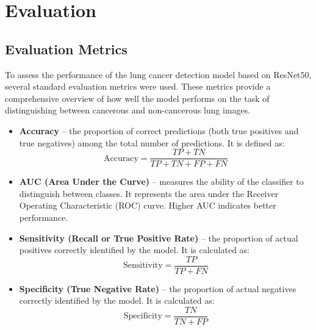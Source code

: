 
\section{Evaluation}


\subsection{Evaluation Metrics}

To assess the performance of the lung cancer detection model based on ResNet50, several standard 
evaluation metrics were used. These metrics provide a comprehensive overview of how well the model 
performs on the task of distinguishing between cancerous and non-cancerous lung images.

\begin{itemize}
    \item \textbf{Accuracy} – the proportion of correct predictions (both true positives and true 
    negatives) among the total number of predictions. It is defined as:
    \[
    \text{Accuracy} = \frac{TP + TN}{TP + TN + FP + FN}
    \]

    \item \textbf{AUC (Area Under the Curve)} – measures the ability of the classifier to 
    distinguish between classes. It represents the area under the Receiver Operating Characteristic 
    (ROC) curve. Higher AUC indicates better performance.

    \item \textbf{Sensitivity (Recall or True Positive Rate)} – the proportion of actual positives 
    correctly identified by the model. It is calculated as:
    \[
    \text{Sensitivity} = \frac{TP}{TP + FN}
    \]

    \item \textbf{Specificity (True Negative Rate)} – the proportion of actual negatives correctly 
    identified by the model. It is calculated as:
    \[
    \text{Specificity} = \frac{TN}{TN + FP}
    \]
\end{itemize}

